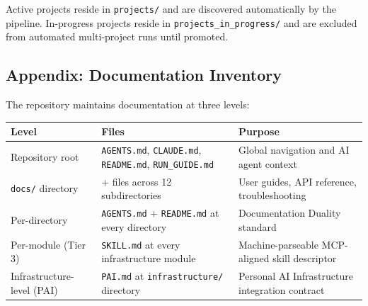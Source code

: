 \documentclass[
]{article}
\newcounter{none} %
\begin{document}
Active projects reside in \texttt{projects/} and are discovered
automatically by the pipeline. In-progress projects reside in
\texttt{projects\_in\_progress/} and are excluded from automated
multi-project runs until promoted.

\newpage

\newpage

\subsection{Appendix: Documentation Inventory}\label{appendix-docs}

The repository maintains documentation at three levels:

\begin{table}[h]
\caption{Documentation inventory across the four-layer documentation architecture, from repository-wide system files to per-module skill descriptors.}
\label{tab:documentation-inventory}
\end{table}

{\def\LTcaptype{none} %
\begin{longtable}[]{@{}
  >{\raggedright\arraybackslash}p{}
  >{\centering\arraybackslash}p{}
  >{\raggedright\arraybackslash}p{}@{}}
\toprule\noalign{}
\begin{minipage}[b]{\linewidth}\raggedright
Level
\end{minipage} & \begin{minipage}[b]{\linewidth}\centering
Files
\end{minipage} & \begin{minipage}[b]{\linewidth}\raggedright
Purpose
\end{minipage} \\
\midrule\noalign{}
\endhead
\bottomrule\noalign{}
\endlastfoot
Repository root & \texttt{AGENTS.md}, \texttt{CLAUDE.md},
\texttt{README.md}, \texttt{RUN\_GUIDE.md} & Global navigation and AI
agent context \\
\texttt{docs/} directory & 90+ files across 12 subdirectories & User
guides, API reference, troubleshooting \\
Per-directory & \texttt{AGENTS.md} + \texttt{README.md} at every
directory & Documentation Duality standard \\
Per-module (Tier 3) & \texttt{SKILL.md} at every infrastructure module &
Machine-parseable MCP-aligned skill descriptor \\
Infrastructure-level (PAI) & \texttt{PAI.md} at \texttt{infrastructure/}
directory & Personal AI Infrastructure integration contract \\
\end{longtable}
}
\end{document}
